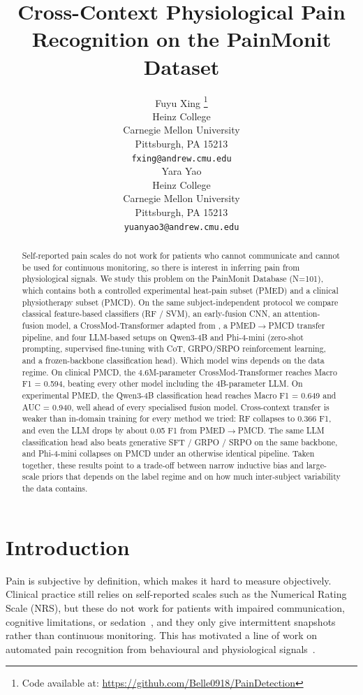 \documentclass{article}
\title{Cross-Context Physiological Pain Recognition on the PainMonit Dataset}
\author{%
  Fuyu Xing \thanks{Code available at:
  \url{https://github.com/Belle0918/PainDetection}} \\
  Heinz College\\
  Carnegie Mellon University \\
  Pittsburgh, PA 15213 \\
  \texttt{fxing@andrew.cmu.edu} \\
  \And
  Yara Yao \\
  Heinz College\\
  Carnegie Mellon University \\
  Pittsburgh, PA 15213 \\
  \texttt{yuanyao3@andrew.cmu.edu} \\
}
\begin{document}
\maketitle
\thispagestyle{firstpage}

\begin{abstract}
Self-reported pain scales do not work for patients who cannot communicate and cannot be used for continuous monitoring, so there is interest in inferring pain from physiological signals. We study this problem on the PainMonit Database (N=101), which contains both a controlled experimental heat-pain subset (PMED) and a clinical physiotherapy subset (PMCD). On the same subject-independent protocol we compare classical feature-based classifiers (RF / SVM), an early-fusion CNN, an attention-fusion model, a CrossMod-Transformer adapted from \citet{farmani2025crossmod}, a PMED$\to$PMCD transfer pipeline, and four LLM-based setups on Qwen3-4B and Phi-4-mini (zero-shot prompting, supervised fine-tuning with CoT, GRPO/SRPO reinforcement learning, and a frozen-backbone classification head). Which model wins depends on the data regime. On clinical PMCD, the 4.6M-parameter CrossMod-Transformer reaches Macro F1 = 0.594, beating every other model including the 4B-parameter LLM. On experimental PMED, the Qwen3-4B classification head reaches Macro F1 = 0.649 and AUC = 0.940, well ahead of every specialised fusion model. Cross-context transfer is weaker than in-domain training for every method we tried: RF collapses to 0.366 F1, and even the LLM drops by about 0.05 F1 from PMED$\to$PMCD. The same LLM classification head also beats generative SFT / GRPO / SRPO on the same backbone, and Phi-4-mini collapses on PMCD under an otherwise identical pipeline. Taken together, these results point to a trade-off between narrow inductive bias and large-scale priors that depends on the label regime and on how much inter-subject variability the data contains.
\end{abstract}

\section{Introduction}

Pain is subjective by definition, which makes it hard to measure objectively. Clinical practice still relies on self-reported scales such as the Numerical Rating Scale (NRS), but these do not work for patients with impaired communication, cognitive limitations, or sedation~\citep{finley1998measurement}, and they only give intermittent snapshots rather than continuous monitoring. This has motivated a line of work on automated pain recognition from behavioural and physiological signals~\citep{gruss2015pain,walter2013biovid,werner2019twofold}.
\end{document}
